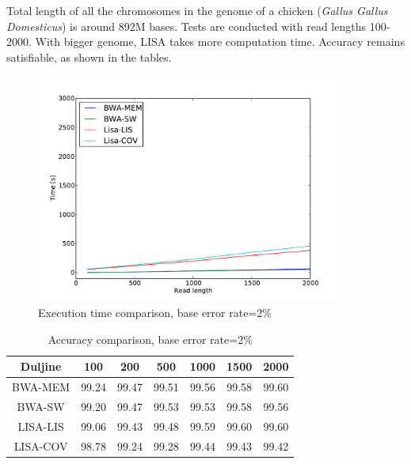 \documentclass[times, utf8, diplomski]{fer}
\begin{document}
Total length of all the chromosomes in the genome of a chicken (\emph{Gallus Gallus Domesticus}) is around 892M bases. Tests are conducted with read lengths 100-2000. With bigger genome, LISA takes more computation time. Accuracy remains satisfiable, as shown in the tables.


\begin{figure}[H]
\centering
\includegraphics[width=0.9\textwidth]{../img/chicken-e02-time.pdf}
\caption{Execution time comparison, base error rate=2\%}\label{chicken-e02-time}
\end{figure}

\begin{table}[H]
\centering
\begin{tabular}{|c||c|c|c|c|c|c|}
\hline
	Duljine & 100 & 200 & 500 & 1000 & 1500 & 2000\\
\hline
\hline
	BWA-MEM & 99.24 & 99.47 & 99.51 & 99.56 & 99.58 & 99.60\\
\hline
	BWA-SW  & 99.20 & 99.47 & 99.53 & 99.53 & 99.58 & 99.56\\
\hline
	LISA-LIS   & 99.06 & 99.43 & 99.48 & 99.59 & 99.60 & 99.60\\
\hline
	LISA-COV & 98.78 & 99.24 & 99.28 & 99.44 & 99.43 & 99.42\\
\hline
\end{tabular}
\caption{Accuracy comparison, base error rate=2\%}\label{chicken-e02-correct}
\end{table}
\end{document}
